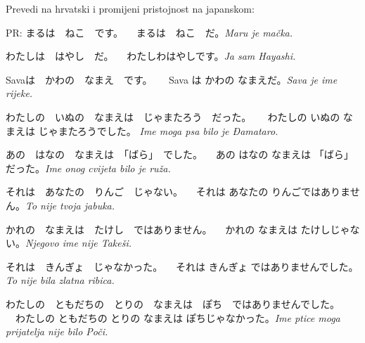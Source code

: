 
\author{Katja Kržišnik}

	
	\begin{mondai}{\ten Prevedi na hrvatski i promijeni pristojnost na japanskom:}
		\item PR: まるは　ねこ　です。 \newline 　まるは　ねこ　だ。\hspace{20pt}\textit{Maru je mačka.}
		\item \vspace{3pt} わたしは　はやし　だ。 \newline 　わたしわはやしです。\hspace{20pt}\textit{Ja sam Hayashi.}
		\item Savaは　かわの　なまえ　です。 \newline 　 Sava は かわの なまえだ。\hspace{20pt}\textit{Sava je ime rijeke.}
		\item わたしの　いぬの　なまえは　じゃまたろう　だった。 \newline 　 わたしの いぬの なまえは じゃまたろうでした。\hspace{20pt} \textit{Ime moga psa bilo je Đamataro.}
		\item あの　はなの　なまえは　「ばら」　でした。 \newline  　あの はなの なまえは 「ばら」 だった。\hspace{20pt}\textit{Ime onog cvijeta bilo je ruža.}
		\item それは　あなたの　りんご　じゃない。 \newline  　それは あなたの りんごではありません。\hspace{20pt}\textit{To nije tvoja jabuka. }
		\item かれの　なまえは　たけし　ではありません。 \newline 　かれの なまえは たけしじゃない。\hspace{20pt}\textit{Njegovo ime nije Takeši. }
		\item それは　きんぎょ　じゃなかった。 \newline  　それは きんぎょ ではありませんでした。\hspace{20pt}\textit{To nije bila zlatna ribica.}
		\item わたしの　ともだちの　とりの　なまえは　ぽち　ではありませんでした。 \newline 　わたしの ともだちの とりの なまえは ぽちじゃなかった。\hspace{20pt}\textit{Ime ptice moga prijatelja nije bilo Poči.}
	\end{mondai}
	
